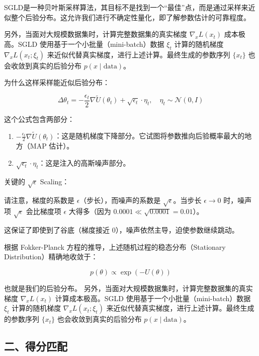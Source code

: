SGLD是一种贝叶斯采样算法，其目标不是找到一个``最佳''点，而是通过采样来近似整个后验分布。这允许我们进行不确定性量化，即了解参数估计的可靠程度。

另外，当面对大规模数据集时，计算完整数据集的真实梯度 \(\nabla_x L(x_t)\) 成本极高。SGLD 使用基于一个小批量（mini-batch）数据 \(\xi_t\) 计算的随机梯度 \(\nabla_x L(x_t;\xi_t)\) 来近似代替真实梯度，进行上述计算。最终生成的参数序列 \(\{x_t\}\) 也会收敛到真实的后验分布 \(p(x\mid\mathrm{data})\)。

为什么这样采样能近似后验分布：

\[
\Delta\theta_t=-\frac{\epsilon_t}{2}\nabla\tilde{U}(\theta_t)+\sqrt{\epsilon_t}\cdot\eta_t,\quad \eta_t\sim\mathcal{N}(0,I)
\]

这个公式包含两部分：

\begin{enumerate}
\def\labelenumi{\arabic{enumi}.}
\tightlist
\item
  \(-\frac{\epsilon_t}{2}\nabla\tilde{U}(\theta_t)\)：这是随机梯度下降部分。它试图将参数推向后验概率最大的地方（MAP 估计）。
\item
  \(\sqrt{\epsilon_t}\cdot\eta_t\)：这是注入的高斯噪声部分。
\end{enumerate}

关键的 \(\sqrt{\epsilon}\) Scaling：

请注意，梯度的系数是 \(\epsilon\)（步长），而噪声的系数是 \(\sqrt{\epsilon}\)。当步长 \(\epsilon\to 0\) 时，噪声项 \(\sqrt{\epsilon}\) 会比梯度项 \(\epsilon\) 大得多（因为 \(0.0001\ll\sqrt{0.0001}=0.01\)）。

这保证了即使到了谷底（梯度接近 0），噪声依然主导，迫使参数继续跳动。

根据 Fokker-Planck 方程的推导，上述随机过程的稳态分布（Stationary Distribution）精确地收敛于：

\[
p(\theta)\propto \exp(-U(\theta))
\]

也就是我们的后验分布。
另外，当面对大规模数据集时，计算完整数据集的真实梯度 \(\nabla_x L(x_t)\) 计算成本极高。SGLD 使用基于一个小批量（mini-batch）数据 \(\xi_t\) 计算的随机梯度 \(\nabla_x L(x_t;\xi_t)\) 来近似代替真实梯度，进行上述计算。最终生成的参数序列 \(\{x_t\}\) 也会收敛到真实的后验分布 \(p(x\mid\mathrm{data})\)。

\hypertarget{ux4e8cux5f97ux5206ux5339ux914d}{%
\subsection{二、得分匹配}\label{ux4e8cux5f97ux5206ux5339ux914d}}

